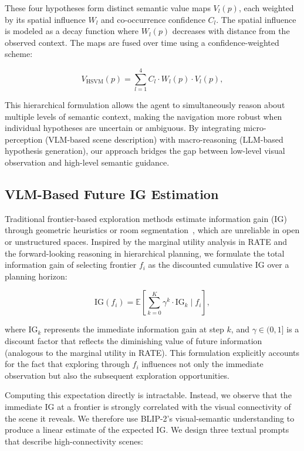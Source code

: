 \documentclass[conference]{IEEEtran}
\begin{document}
These four hypotheses form distinct semantic value maps $V_l(p)$, each weighted by its spatial influence $W_l$ and co-occurrence confidence $C_l$. The spatial influence is modeled as a decay function where $W_l(p)$ decreases with distance from the observed context. The maps are fused over time using a confidence-weighted scheme:

\[
V_{\text{HSVM}}(p) = \sum_{l=1}^{4} C_l \cdot W_l(p) \cdot V_l(p),
\]

This hierarchical formulation allows the agent to simultaneously reason about multiple levels of semantic context, making the navigation more robust when individual hypotheses are uncertain or ambiguous. By integrating micro-perception (VLM-based scene description) with macro-reasoning (LLM-based hypothesis generation), our approach bridges the gap between low-level visual observation and high-level semantic guidance.


\subsection{VLM-Based Future IG Estimation}
\label{subsec:VLM-Based_Future_IG_Estimation}
Traditional frontier-based exploration methods estimate information gain (IG) through geometric heuristics or room segmentation~\cite{bircher2016receding}, which are unreliable in open or unstructured spaces. Inspired by the marginal utility analysis in RATE and the forward-looking reasoning in hierarchical planning, we formulate the total information gain of selecting frontier \(f_i\) as the discounted cumulative IG over a planning horizon:

\[
\text{IG}(f_i) = \mathbb{E} \left[ \sum_{k=0}^{K} \gamma^k \cdot \text{IG}_k \mid f_i \right],
\]

where \(\text{IG}_k\) represents the immediate information gain at step \(k\), and \(\gamma \in (0,1]\) is a discount factor that reflects the diminishing value of future information (analogous to the marginal utility in RATE). This formulation explicitly accounts for the fact that exploring through \(f_i\) influences not only the immediate observation but also the subsequent exploration opportunities.

Computing this expectation directly is intractable. Instead, we observe that the immediate IG at a frontier is strongly correlated with the visual connectivity of the scene it reveals. We therefore use BLIP-2's visual-semantic understanding to produce a linear estimate of the expected IG. We design three textual prompts that describe high-connectivity scenes:
\end{document}
